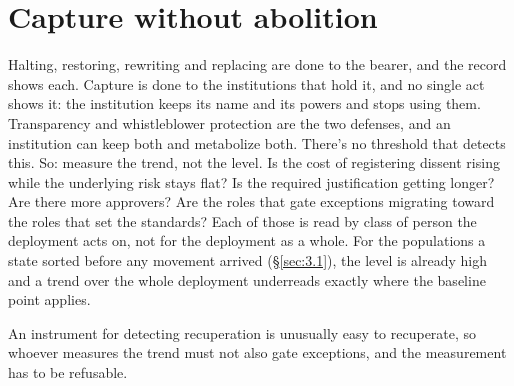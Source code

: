 \section{Capture without abolition}
\label{sec:13.7}
Halting, restoring, rewriting and replacing are done to the bearer, and the record shows each. Capture is done to the institutions that hold it, and no single act shows it: the institution keeps its name and its powers and stops using them. Transparency and whistleblower protection are the two defenses, and an institution can keep both and metabolize both. There's no threshold that detects this. So: measure the trend, not the level. Is the cost of registering dissent rising while the underlying risk stays flat? Is the required justification getting longer? Are there more approvers? Are the roles that gate exceptions migrating toward the roles that set the standards? Each of those is read by class of person the deployment acts on, not for the deployment as a whole. For the populations a state sorted before any movement arrived (\S\ref{sec:3.1}), the level is already high and a trend over the whole deployment underreads exactly where the baseline point applies.

An instrument for detecting recuperation is unusually easy to recuperate, so whoever measures the trend must not also gate exceptions, and the measurement has to be refusable.
